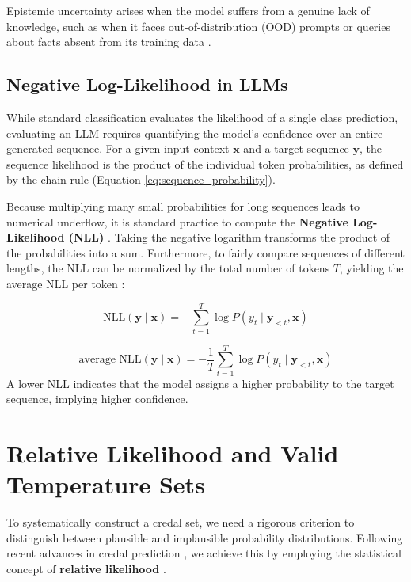 Epistemic uncertainty arises when the model suffers from a genuine
lack of knowledge, such as when it faces out-of-distribution (OOD)
prompts or queries about facts absent from its training data
\parencite{kendall2017uncertaintiesneedbayesiandeep, H_llermeier_2021}.

\subsection{Negative Log-Likelihood in LLMs}
\label{sec:background:quantifying_uncertainty_in_llms:nll_in_llms}
While standard classification evaluates the likelihood of a 
single class prediction, evaluating an LLM requires quantifying
the model's confidence over an entire generated sequence.
For a given input context $\mathbf{x}$ and a target sequence
$\mathbf{y}$, the sequence likelihood is the product of the 
individual token probabilities, as defined by the chain rule
(Equation \ref{eq:sequence_probability}).

Because multiplying many small probabilities for long sequences
leads to numerical underflow, it is standard practice to compute 
the \textbf{Negative Log-Likelihood (NLL)} 
\parencite{Goodfellow-et-al-2016}.
Taking the negative logarithm transforms the product of the 
probabilities into a sum. Furthermore, to fairly compare sequences 
of different lengths, the NLL can be normalized by the total
number of tokens $T$, yielding the average NLL per token
\parencite{murray2018correctinglengthbiasneural}:

\begin{equation}
    \text{NLL}(\mathbf{y} \mid \mathbf{x}) 
    = -\sum_{t=1}^{T} \log P(y_t \mid \mathbf{y}_{<t}, \mathbf{x})
    \label{eq:nll}
\end{equation}

\begin{equation}
    \text{average NLL}(\mathbf{y} \mid \mathbf{x}) 
    = -\frac{1}{T} \sum_{t=1}^{T} \log P (y_t \mid \mathbf{y}_{<t}, \mathbf{x})
    \label{eq:average_nll}
\end{equation}
A lower NLL indicates that the model assigns a higher
probability to the target sequence, implying higher confidence.
\section{Relative Likelihood and Valid Temperature Sets}
\label{sec:background:rel_ll_and_temp_sets}
To systematically construct a credal set, we need a rigorous criterion
to distinguish between plausible and implausible probability
distributions. Following recent advances in credal prediction
\parencite{löhr2025credalpredictionbasedrelative}, 
we achieve this by employing the statistical concept of 
\textbf{relative likelihood} 
\parencite{largesampledistribution, cox1979theoretical}.


